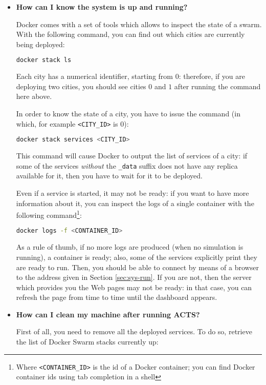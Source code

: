 \begin{itemize}
\item \textbf{How can I know the system is up and running?}

Docker comes with a set of tools which allows to inspect the state of a swarm.
With the following command, you can find out which cities are currently being
deployed:

\begin{lstlisting}[language=bash]
docker stack ls
\end{lstlisting}

Each city has a numerical identifier, starting from $0$: therefore, if you are
deploying two cities, you should see cities $0$ and $1$ after running the
command here above.

In order to know the state of a city, you have to issue the command (in which,
for example \texttt{<CITY\_ID>} is $0$):

\begin{lstlisting}[language=bash]
docker stack services <CITY_ID>
\end{lstlisting}

This command will cause Docker to output the list of services of a city: if
some of the services \emph{without} the \texttt{\_data} suffix does not have
any replica available for it, then you have to wait for it to be deployed.

Even if a service is started, it may not be ready: if you want to have more
information about it, you can inspect the logs of a single container with the
following command\footnote{Where \texttt{<CONTAINER\_ID>} is the id of a Docker
container; you can find Docker container ids using tab completion in a shell}:

\begin{lstlisting}[language=bash]
docker logs -f <CONTAINER_ID>
\end{lstlisting}

As a rule of thumb, if no more logs are produced (when no simulation is
running), a container is ready; also, some of the services explicitly print
they are ready to run.
Then, you should be able to connect by means of a browser to the address given
in Section \ref{sec:sys-run}.
If you are not, then the server which provides you the Web pages may not be
ready: in that case, you can refresh the page from time to time until the
dashboard appears.

\item \textbf{How can I clean my machine after running ACTS?}

First of all, you need to remove all the deployed services.
To do so, retrieve the list of Docker Swarm stacks currently up:


\end{itemize}
